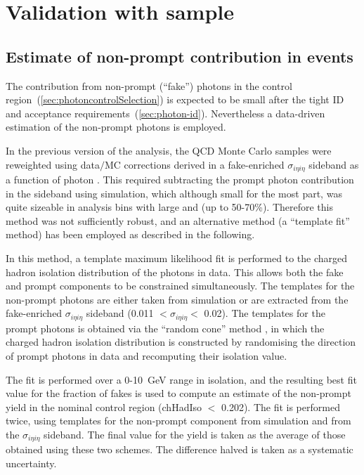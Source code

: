
\section{Validation with \texorpdfstring{\gj}{gamma+jets} sample}
\label{app:gjets}

\subsection{Estimate of non-prompt contribution in \texorpdfstring{\gj}{gamma+jets} events}
\label{sec:photon-purity}

The contribution from non-prompt (``fake'') photons in the \gj control 
region~(\ref{sec:photoncontrolSelection}) is expected to be small after
the tight ID and acceptance requirements~(\ref{sec:photon-id}). 
Nevertheless a data-driven estimation of the non-prompt photons is
employed. 

In the previous version of the analysis, the QCD Monte Carlo samples
were reweighted using data$/$MC corrections derived in a fake-enriched
$\sigma_{i\eta i\eta}$ sideband as a function of photon \Pt. This
required subtracting the prompt photon contribution in the sideband
using simulation, which although small for the most part, was quite
sizeable in analysis bins with large \njet and \HT (up to 50-70\%).
Therefore this method was not sufficiently robust, and an alternative
method (a ``template fit'' method) has been employed as described in
the following.

In this method, a template maximum likelihood fit is performed to the
charged hadron isolation distribution of the photons in data. This
allows both the fake and prompt components to be constrained
simultaneously. The templates for the non-prompt photons are either
taken from simulation or are extracted from the fake-enriched
$\sigma_{i\eta i\eta}$ sideband (0.011 $< \sigma_{i\eta i\eta} <$
0.02).  The templates for the prompt photons is obtained via the
``random cone'' method \cite{random-cone}, in which the charged hadron
isolation distribution is constructed by randomising the direction of
prompt photons in data and recomputing their isolation value.

The fit is performed over a 0-10~GeV range in isolation, and the
resulting best fit value for the fraction of fakes is used to compute
an estimate of the non-prompt yield in the nominal \gj control region
(chHadIso $<$ 0.202). The fit is performed twice, using templates for
the non-prompt component from simulation and from the $\sigma_{i\eta
  i\eta}$ sideband. The final value for the yield is taken as the
average of those obtained using these two schemes. The difference
halved is taken as a systematic uncertainty.

